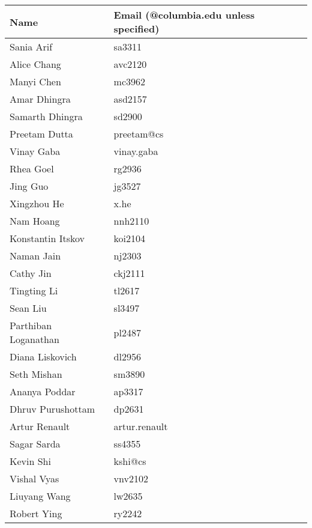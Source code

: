 \begin{tabular}{ll}
Name & Email (@columbia.edu unless specified) \\ \hline
Sania Arif & sa3311 \\
Alice Chang & avc2120 \\
Manyi Chen & mc3962 \\
Amar Dhingra & asd2157 \\
Samarth Dhingra & sd2900 \\
Preetam Dutta & preetam@cs \\
Vinay Gaba & vinay.gaba \\
Rhea Goel & rg2936 \\
Jing Guo & jg3527 \\
Xingzhou He & x.he \\
Nam Hoang & nnh2110 \\
Konstantin Itskov & koi2104 \\
Naman Jain & nj2303 \\
Cathy Jin & ckj2111 \\
Tingting Li & tl2617 \\
Sean Liu & sl3497 \\
Parthiban Loganathan & pl2487 \\
Diana Liskovich & dl2956 \\
Seth Mishan & sm3890 \\
Ananya Poddar & ap3317 \\
Dhruv Purushottam & dp2631 \\
Artur Renault & artur.renault \\
Sagar Sarda & ss4355 \\
Kevin Shi & kshi@cs \\
Vishal Vyas & vnv2102 \\
Liuyang Wang & lw2635 \\
Robert Ying & ry2242 \\
\end{tabular}
